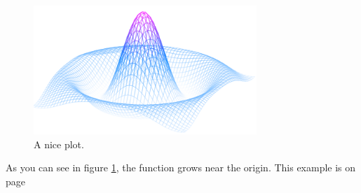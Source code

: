 \documentclass{article}
\begin{document}
	
	\begin{figure}[h]
		\centering
		\includegraphics[width=0.75\textwidth]{mesh}
		\caption{A nice plot.}
		\label{fig:mesh1}
	\end{figure}
	
	As you can see in figure \ref{fig:mesh1}, the function grows near the origin. This example is on page \pageref{fig:mesh1}
	
\end{document}
